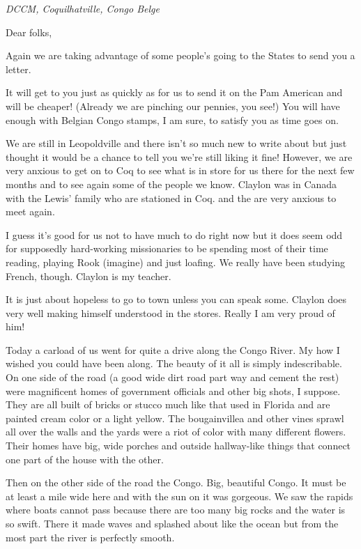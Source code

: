 \documentclass[
]{book}
\begin{document}
\emph{DCCM, Coquilhatville, Congo Belge}

Dear folks,

Again we are taking advantage of some people's going to the States to send you a letter.

It will get to you just as quickly as for us to send it on the Pam American and will be cheaper! (Already we are pinching our pennies, you see!) You will have enough with Belgian Congo stamps, I am sure, to satisfy you as time goes on.

We are still in Leopoldville and there isn't so much new to write about but just thought it would be a chance to tell you we're still liking it fine! However, we are very anxious to get on to Coq to see what is in store for us there for the next few months and to see again some of the people we know. Claylon was in Canada with the Lewis' family who are stationed in Coq. and the are very anxious to meet again.

I guess it's good for us not to have much to do right now but it does seem odd for supposedly hard-working missionaries to be spending most of their time reading, playing Rook (imagine) and just loafing. We really have been studying French, though. Claylon is my teacher.

It is just about hopeless to go to town unless you can speak some. Claylon does very well making himself understood in the stores. Really I am very proud of him!

Today a carload of us went for quite a drive along the Congo River. My how I wished you could have been along. The beauty of it all is simply indescribable. On one side of the road (a good wide dirt road part way and cement the rest) were magnificent homes of government officials and other big shots, I suppose. They are all built of bricks or stucco much like that used in Florida and are painted cream color or a light yellow. The bougainvillea and other vines sprawl all over the walls and the yards were a riot of color with many different flowers. Their homes have big, wide porches and outside hallway-like things that connect one part of the house with the other.

Then on the other side of the road the Congo. Big, beautiful Congo. It must be at least a mile wide here and with the sun on it was gorgeous. We saw the rapids where boats cannot pass because there are too many big rocks and the water is so swift. There it made waves and splashed about like the ocean but from the most part the river is perfectly smooth.
\end{document}
